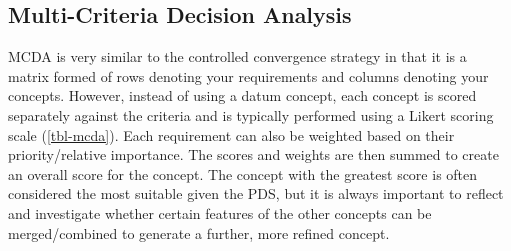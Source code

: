 \subsection{Multi-Criteria Decision Analysis}

\acf{MCDA} is very similar to the controlled convergence strategy in that it is a matrix formed of rows denoting your requirements and columns denoting your concepts. However, instead of using a datum concept, each concept is scored separately against the criteria and is typically performed using a Likert scoring scale (\cref{tbl-mcda}). Each requirement can also be weighted based on their priority/relative importance. The scores and weights are then summed to create an overall score for the concept. The concept with the greatest score is often considered the most suitable given the \ac{PDS}, but it is always important to reflect and investigate whether certain features of the other concepts can be merged/combined to generate a further, more refined concept.

